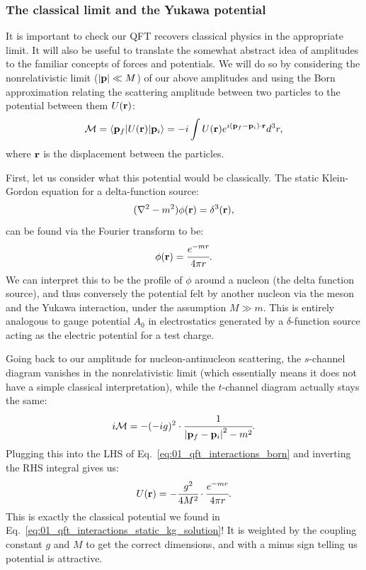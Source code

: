 \subsubsection{The classical limit and the Yukawa potential}

It is important to check our QFT recovers classical physics in the appropriate limit.
It will also be useful to translate the somewhat abstract idea of amplitudes to the familiar concepts of forces and potentials.
We will do so by considering the nonrelativistic limit ($\left\lvert \mathbf{p} \right\rvert \ll M$) of our above amplitudes and using the Born approximation relating the scattering amplitude between two particles to the potential between them $U(\mathbf{r})$:
\begin{equation}
	\label{eq:01_qft_interactions_born}
	\mathcal M = \braket{\mathbf{p}_f|U(\mathbf{r})|\mathbf{p}_i} = -i \int U(\mathbf{r}) e^{i(\mathbf{p}_f - \mathbf{p}_i)\cdot\mathbf{r}} d^3r,
\end{equation}
where $\mathbf{r}$ is the displacement between the particles.

First, let us consider what this potential would be classically.
The static Klein-Gordon equation for a delta-function source:
\begin{equation}
	\label{eq:01_qft_interactions_static_kg}
	(\nabla^2 - m^2) \phi(\mathbf{r}) = \delta^3(\mathbf{r}),
\end{equation}
can be found via the Fourier transform to be:
\begin{equation}
	\label{eq:01_qft_interactions_static_kg_solution}
	\phi(\mathbf{r}) =  \cfrac{e^{-mr}}{4\pi r}.
\end{equation}
We can interpret this to be the profile of $\phi$ around a nucleon (the delta function source), and thus conversely the potential felt by another nucleon via the meson and the Yukawa interaction, under the assumption $M \gg m$.
This is entirely analogous to gauge potential $A_0$ in electrostatics generated by a $\delta$-function source acting as the electric potential for a test charge.

Going back to our amplitude for nucleon-antinucleon scattering, the $s$-channel diagram vanishes in the nonrelativistic limit (which essentially means it does not have a simple classical interpretation), while the $t$-channel diagram actually stays the same:
\begin{equation}
	\label{eq:01_qft_interactions_na_scattering_nr}
	i \mathcal M = -(-ig)^2 \cdot \cfrac{1}{\left\lvert \mathbf{p}_f - \mathbf{p}_i \right\rvert^2 - m^2}.
\end{equation}
Plugging this into the LHS of Eq.~\ref{eq:01_qft_interactions_born} and inverting the RHS integral gives us:
\begin{equation}
	\label{eq:01_qft_interactions_yukawa_potential}
	U(\mathbf{r}) = -\cfrac{g^2}{4M^2} \cdot \cfrac{e^{-mr}}{4\pi r}.
\end{equation}
This is exactly the classical potential we found in Eq.~\ref{eq:01_qft_interactions_static_kg_solution}!
It is weighted by the coupling constant $g$ and $M$ to get the correct dimensions, and with a minus sign telling us potential is attractive.

